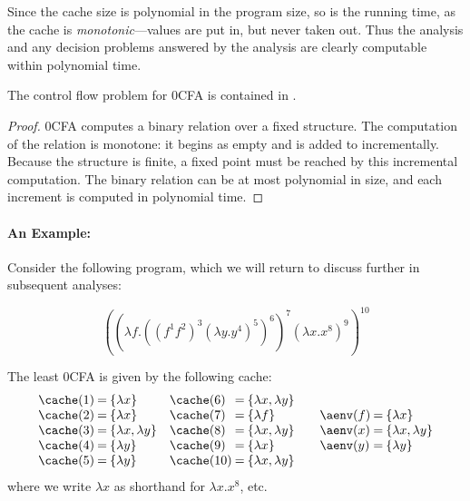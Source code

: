 Since the cache size is polynomial in the program size, so is the
running time, as the cache is {\em monotonic}---values are put in, but
never taken out.  Thus the analysis and any decision problems
answered by the analysis are clearly computable within polynomial
time.

\begin{lemma}
The control flow problem for 0CFA is contained in \ptime.
\end{lemma}
\begin{proof}
0CFA computes a binary relation over a fixed structure.  The
computation of the relation is monotone: it begins as empty and is
added to incrementally.  Because the structure is finite, a fixed
point must be reached by this incremental computation.  The binary
relation can be at most polynomial in size, and each increment is
computed in polynomial time.
\end{proof}


\paragraph{An Example:} 

Consider the following program, which we will return to discuss
further in subsequent analyses:

\begin{displaymath}
((\lambda f.((f^1 f^2)^3(\lambda y.y^4)^5)^6)^7 (\lambda
x.x^8)^9)^{10}
\end{displaymath}

The least 0CFA is given by the following cache:
\begin{displaymath}
\begin{array}{l@{\:=\:}l@{\hspace{10pt}}l@{\:=\:}l}
\cache(1) & \{ \lambda x \} &
\cache(6) & \{ \lambda x, \lambda y \} \\
\cache(2) & \{ \lambda x \} &
\cache(7) & \{ \lambda f \} \\
\cache(3) & \{ \lambda x, \lambda y \} &
\cache(8) & \{ \lambda x, \lambda y \} \\
\cache(4) & \{ \lambda y \} &
\cache(9) & \{ \lambda x \} \\
\cache(5) & \{ \lambda y \} &
\cache(10)& \{ \lambda x, \lambda y \}
\end{array}
\hspace{10pt}
\begin{array}{l@{\:=\:}l}
\aenv(f) & \{ \lambda x \} \\
\aenv(x) & \{ \lambda x, \lambda y \}\\
\aenv(y) & \{ \lambda y \}
\end{array}
\end{displaymath}
where we write $\lambda x$ as shorthand for $\lambda x.x^8$, etc.


